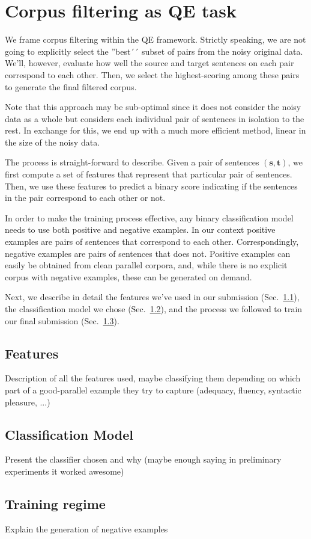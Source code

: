 \section{Corpus filtering as QE task}

We frame corpus filtering within the QE framework. Strictly speaking, we are not going to explicitly select the ''best´´ subset of pairs from the noisy original data. We'll, however, evaluate how well the source and target sentences on each pair correspond to each other. Then, we select the highest-scoring among these pairs to generate the final filtered corpus.

Note that this approach may be sub-optimal since it does not consider the noisy data as a whole but considers each individual pair of sentences in isolation to the rest. In exchange for this, we end up with a much more efficient method, linear in the size of the noisy data.

The process is straight-forward to describe. Given a pair of sentences $(\mathbf{s}, \mathbf{t})$, we first compute a set of features that represent that particular pair of sentences. Then, we use these features to predict a binary score indicating if the sentences in the pair correspond to each other or not. 

In order to make the training process effective, any binary classification model needs to use both positive and negative examples. In our context positive examples are pairs of sentences that correspond to each other. Correspondingly, negative examples are pairs of sentences that does not. Positive examples can easily be obtained from clean parallel corpora, and, while there is no explicit corpus with negative examples, these can be generated on demand. 

Next, we describe in detail the features we've used in our submission (Sec.~\ref{ssec:features}), the classification model we chose (Sec.~\ref{ssec:model}), and the process we followed to train our final submission (Sec.~\ref{ssec:training}).


\subsection{Features}
\label{ssec:features}

Description of all the features used, maybe classifying them depending on which part of a good-parallel example they try to capture (adequacy, fluency, syntactic pleasure, ...)

\subsection{Classification Model}
\label{ssec:model}

Present the classifier chosen and why (maybe enough saying in preliminary experiments it worked awesome)


\subsection{Training regime}
\label{ssec:training}

Explain the generation of negative examples
\cite{Hainan17}